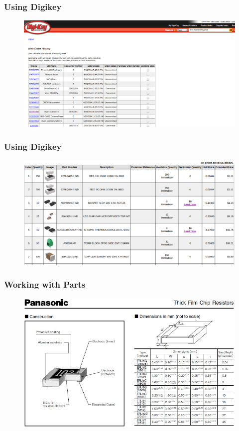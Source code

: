 \documentclass{beamer}
\begin{document}
\begin{frame}
\frametitle{Using Digikey}
\begin{figure}
\includegraphics[width=1.0\linewidth]{digikey.png}
\end{figure}
\end{frame}


\begin{frame}
\frametitle{Using Digikey}
\begin{figure}
\includegraphics[width=1.0\linewidth]{parts.png}
\end{figure}
\end{frame}


\begin{frame}
\frametitle{Working with Parts}
\begin{figure}
\includegraphics[width=1.0\linewidth]{panasonic.png}
\end{figure}
\end{frame}
\end{document}
